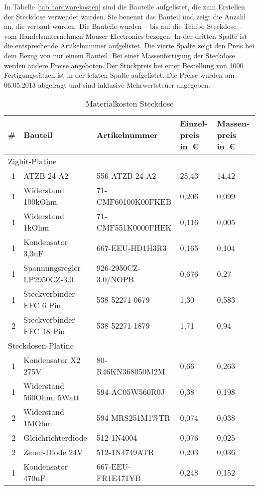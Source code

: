In Tabelle \ref{tab:hardwarekosten} sind die Bauteile aufgelistet, die zum Erstellen der Steckdose verwendet wurden. Sie benennt das Bauteil und zeigt die Anzahl an, die verbaut wurden. Die Bauteile wurden -- bis auf die Tchibo Steckdose -- vom Handelsunternehmen Mouser Electronics bezogen. In der dritten Spalte ist die entsprechende Artikelnummer aufgelistet. Die vierte Spalte zeigt den Preis bei dem Bezug von nur einem Bauteil. Bei einer Massenfertigung der Steckdose werden andere Preise angeboten. Der Stückpreis bei einer Bestellung von 1000 Fertigungssätzen ist in der letzten Spalte aufgelistet. Die Preise wurden am 06.05.2013 abgefragt und sind inklusive Mehrwertsteuer angegeben.

\begin{table}[btp]
\small
\caption{Materialkosten Steckdose}
\begin{tabular}{|r|l|l|p{2cm}|p{2cm}|}\hline
  \textbf{\#} & \textbf{Bauteil} & \textbf{Artikelnummer} & \textbf{Einzel-preis in~€} & \textbf{Massen-preis in~€} \\ \hline
  \multicolumn{5}{|l|}{Zigbit-Platine} \\ \hline
  1 & ATZB-24-A2 & 556-ATZB-24-A2 & 25,43 & 14,42 \\ \hline
  1 & Widerstand 100kOhm & 71-CMF60100K00FKEB & 0,206 & 0,099 \\ \hline
  1 & Widerstand 1kOhm & 71-CMF551K0000FHEK  & 0,116 & 0,005 \\ \hline
  1 & Kondensator 3,3uF & 667-EEU-HD1H3R3 & 0,165 & 0,104 \\ \hline
  1 & Spannungsregler LP2950CZ-3.0 & 926-2950CZ-3.0/NOPB & 0,676 & 0,27 \\ \hline
  1 & Steckverbinder FFC 6 Pin & 538-52271-0679 & 1,30 & 0,583 \\ \hline
  2 & Steckverbinder FFC 18 Pin & 538-52271-1879 & 1,71 & 0,94 \\ \hline
  \multicolumn{5}{|l|}{Steckdosen-Platine} \\ \hline
  1 & Kondensator X2 275V & 80-R46KN368050M2M & 0,66 & 0,263 \\ \hline
  1 & Widerstand 560Ohm, 5Watt & 594-AC05W560R0J & 0,38 & 0,198 \\ \hline
  2 & Widerstand 1MOhm & 594-MRS251M1\%TR & 0,074 & 0,038 \\ \hline
  2 & Gleichrichterdiode & 512-1N4004 & 0,076 & 0,025 \\ \hline
  2 & Zener-Diode 24V & 512-1N4749ATR & 0,203 & 0,036 \\ \hline
  1 & Kondensator 470uF & 667-EEU-FR1E471YB & 0,248 & 0,152 \\ \hline

\end{tabular}
\end{table}
